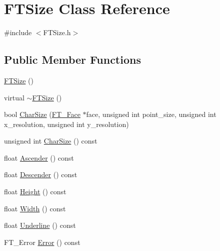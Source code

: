 \hypertarget{class_f_t_size}{}\section{F\+T\+Size Class Reference}
\label{class_f_t_size}


{\ttfamily \#include $<$F\+T\+Size.\+h$>$}

\subsection*{Public Member Functions}
\begin{DoxyCompactItemize}
\item 
\hyperlink{class_f_t_size_ae1b459031c2ab7fe6ef98530c0251700}{F\+T\+Size} ()
\item 
virtual \hyperlink{class_f_t_size_a7bf23332d879f3e9d76675290012b275}{$\sim$\+F\+T\+Size} ()
\item 
bool \hyperlink{class_f_t_size_a15c6c82655544d1edb101e00e42ffad9}{Char\+Size} (\hyperlink{struct_f_t___face_rec__}{F\+T\+\_\+\+Face} $\ast$face, unsigned int point\+\_\+size, unsigned int x\+\_\+resolution, unsigned int y\+\_\+resolution)
\item 
unsigned int \hyperlink{class_f_t_size_a489fba0a722afd8dfa2a67142cd51767}{Char\+Size} () const 
\item 
float \hyperlink{class_f_t_size_a7865c27cb979feace5ccce2fb544a490}{Ascender} () const 
\item 
float \hyperlink{class_f_t_size_a75c1b86d32c5ea1d296234edb1e4b7ab}{Descender} () const 
\item 
float \hyperlink{class_f_t_size_af0e7398f27936ffe4cbed04c3cfa889d}{Height} () const 
\item 
float \hyperlink{class_f_t_size_a8fe639fa29815a89cdd84138b2564840}{Width} () const 
\item 
float \hyperlink{class_f_t_size_ab85fb58156a855d01b5a4e9e1b91e0e2}{Underline} () const 
\item 
F\+T\+\_\+\+Error \hyperlink{class_f_t_size_a990a2df40c9c1ed06db8d34b2ac3580b}{Error} () const 
\end{DoxyCompactItemize}
